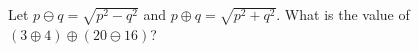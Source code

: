 Let $p\ominus q=\sqrt{p^2-q^2}$ and $p\oplus q=\sqrt{p^2+q^2}$. What is the value of $(3\oplus4)\oplus(20\ominus16)$?
